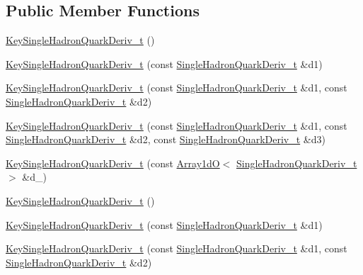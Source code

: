 \subsection*{Public Member Functions}
\begin{DoxyCompactItemize}
\item 
\mbox{\hyperlink{structHadron_1_1KeySingleHadronQuarkDeriv__t_a0f700137eb8da25f983d2fe6cf1b4576}{Key\+Single\+Hadron\+Quark\+Deriv\+\_\+t}} ()
\item 
\mbox{\hyperlink{structHadron_1_1KeySingleHadronQuarkDeriv__t_aa5c8f28f9618d243cca0dc7b1be6ed59}{Key\+Single\+Hadron\+Quark\+Deriv\+\_\+t}} (const \mbox{\hyperlink{structHadron_1_1SingleHadronQuarkDeriv__t}{Single\+Hadron\+Quark\+Deriv\+\_\+t}} \&d1)
\item 
\mbox{\hyperlink{structHadron_1_1KeySingleHadronQuarkDeriv__t_ae44429f98ae01120f81174b6899a8b13}{Key\+Single\+Hadron\+Quark\+Deriv\+\_\+t}} (const \mbox{\hyperlink{structHadron_1_1SingleHadronQuarkDeriv__t}{Single\+Hadron\+Quark\+Deriv\+\_\+t}} \&d1, const \mbox{\hyperlink{structHadron_1_1SingleHadronQuarkDeriv__t}{Single\+Hadron\+Quark\+Deriv\+\_\+t}} \&d2)
\item 
\mbox{\hyperlink{structHadron_1_1KeySingleHadronQuarkDeriv__t_a228d03db64fbe8db5371d92e4fb3806e}{Key\+Single\+Hadron\+Quark\+Deriv\+\_\+t}} (const \mbox{\hyperlink{structHadron_1_1SingleHadronQuarkDeriv__t}{Single\+Hadron\+Quark\+Deriv\+\_\+t}} \&d1, const \mbox{\hyperlink{structHadron_1_1SingleHadronQuarkDeriv__t}{Single\+Hadron\+Quark\+Deriv\+\_\+t}} \&d2, const \mbox{\hyperlink{structHadron_1_1SingleHadronQuarkDeriv__t}{Single\+Hadron\+Quark\+Deriv\+\_\+t}} \&d3)
\item 
\mbox{\hyperlink{structHadron_1_1KeySingleHadronQuarkDeriv__t_a35ce6c87867b7b8938820f4869b3f91c}{Key\+Single\+Hadron\+Quark\+Deriv\+\_\+t}} (const \mbox{\hyperlink{classADAT_1_1Array1dO}{Array1dO}}$<$ \mbox{\hyperlink{structHadron_1_1SingleHadronQuarkDeriv__t}{Single\+Hadron\+Quark\+Deriv\+\_\+t}} $>$ \&d\+\_\+)
\item 
\mbox{\hyperlink{structHadron_1_1KeySingleHadronQuarkDeriv__t_a0f700137eb8da25f983d2fe6cf1b4576}{Key\+Single\+Hadron\+Quark\+Deriv\+\_\+t}} ()
\item 
\mbox{\hyperlink{structHadron_1_1KeySingleHadronQuarkDeriv__t_aa5c8f28f9618d243cca0dc7b1be6ed59}{Key\+Single\+Hadron\+Quark\+Deriv\+\_\+t}} (const \mbox{\hyperlink{structHadron_1_1SingleHadronQuarkDeriv__t}{Single\+Hadron\+Quark\+Deriv\+\_\+t}} \&d1)
\item 
\mbox{\hyperlink{structHadron_1_1KeySingleHadronQuarkDeriv__t_ae44429f98ae01120f81174b6899a8b13}{Key\+Single\+Hadron\+Quark\+Deriv\+\_\+t}} (const \mbox{\hyperlink{structHadron_1_1SingleHadronQuarkDeriv__t}{Single\+Hadron\+Quark\+Deriv\+\_\+t}} \&d1, const \mbox{\hyperlink{structHadron_1_1SingleHadronQuarkDeriv__t}{Single\+Hadron\+Quark\+Deriv\+\_\+t}} \&d2)

\end{DoxyCompactItemize}

